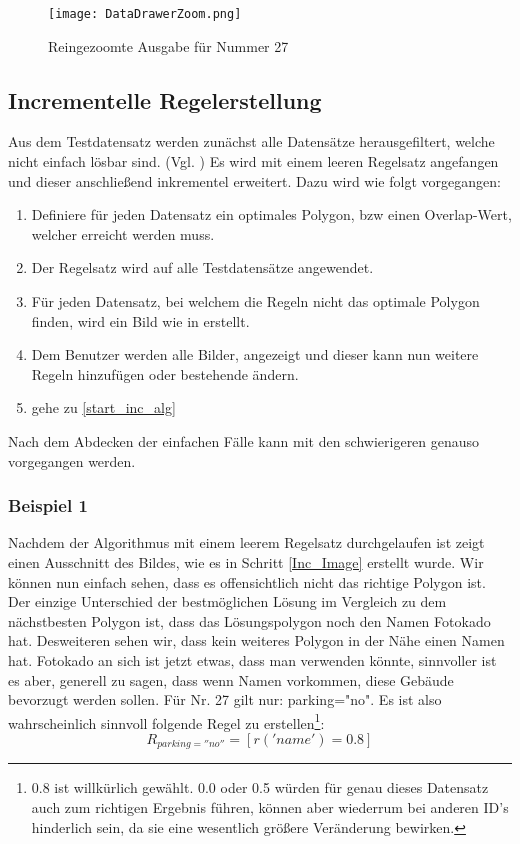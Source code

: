 \begin{figure}
 \centering
 \texttt{[image: DataDrawerZoom.png]}
 \caption{Reingezoomte Ausgabe für Nummer 27}
 \label{fig:DataDrawerZoom}
\end{figure}

\subsection{Incrementelle Regelerstellung}
Aus dem Testdatensatz werden zunächst alle Datensätze herausgefiltert, welche nicht einfach lösbar sind.
(Vgl. )
Es wird mit einem leeren Regelsatz angefangen und dieser anschließend inkrementel erweitert. Dazu wird wie folgt vorgegangen:
\begin{enumerate}
\item Definiere für jeden Datensatz ein optimales Polygon, bzw einen Overlap-Wert, welcher erreicht werden muss.
\item Der Regelsatz wird auf alle Testdatensätze angewendet. \label{start_inc_alg}
\item Für jeden Datensatz, bei welchem die Regeln nicht das optimale Polygon finden, wird ein Bild wie in  erstellt. \label{Inc_Image}
\item Dem Benutzer werden alle Bilder, angezeigt und dieser kann nun weitere Regeln hinzufügen oder bestehende ändern.
\item gehe zu \ref{start_inc_alg}
\end{enumerate}

Nach dem Abdecken der einfachen Fälle kann mit den schwierigeren genauso vorgegangen werden.

\subsubsection{Beispiel 1}
Nachdem der Algorithmus mit einem leerem Regelsatz durchgelaufen ist zeigt
 einen Ausschnitt des Bildes, wie es in Schritt \ref{Inc_Image} erstellt wurde. Wir können nun einfach sehen,
dass es offensichtlich nicht das richtige Polygon ist. Der einzige Unterschied der bestmöglichen Lösung im Vergleich zu dem nächstbesten Polygon ist,
dass das Lösungspolygon noch den Namen Fotokado hat. Desweiteren sehen wir, dass kein weiteres Polygon in der Nähe einen Namen hat.
Fotokado an sich ist jetzt etwas, dass man verwenden könnte, sinnvoller ist es aber, generell zu sagen, dass wenn Namen vorkommen, diese Gebäude
bevorzugt werden sollen. Für Nr. 27 gilt nur: parking="no". Es ist also wahrscheinlich sinnvoll folgende Regel zu erstellen\footnote{0.8 ist willkürlich gewählt.
0.0 oder 0.5 würden für genau dieses Datensatz auch zum richtigen Ergebnis führen, können aber wiederrum bei anderen ID's hinderlich sein,
da sie eine wesentlich größere Veränderung bewirken.}:
\begin{equation*}
R_{parking=''no''} = [r('name') = 0.8]
\end{equation*}


